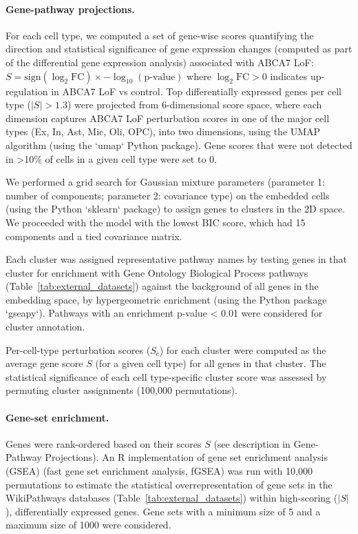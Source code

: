 \paragraph{Gene-pathway projections.}
For each cell type, we computed a set of gene-wise scores quantifying the direction and statistical significance of gene expression changes (computed as part of the differential gene expression analysis) associated with ABCA7 LoF:
$ S = \text{sign}(\log_2\text{FC}) \times -\log_{10}(\text{p-value}) $
where $\log_2\text{FC} > 0$ indicates up-regulation in ABCA7 LoF vs control. Top differentially expressed genes per cell type ($|S| > 1.3$) were projected from 6-dimensional score space, where each dimension captures ABCA7 LoF perturbation scores in one of the major cell types (Ex, In, Ast, Mic, Oli, OPC), into two dimensions, using the UMAP algorithm (using the `umap` Python package). Gene scores that were not detected in >10\% of cells in a given cell type were set to 0.

We performed a grid search for Gaussian mixture parameters (parameter 1: number of components; parameter 2: covariance type) on the embedded cells (using the Python `sklearn` package) to assign genes to clusters in the 2D space. We proceeded with the model with the lowest BIC score, which had 15 components and a tied covariance matrix.

Each cluster was assigned representative pathway names by testing genes in that cluster for enrichment with Gene Ontology Biological Process pathways (Table~\ref{tab:external_datasets}) against the background of all genes in the embedding space, by hypergeometric enrichment (using the Python package `gseapy`). Pathways with an enrichment p-value < 0.01 were considered for cluster annotation.

Per-cell-type perturbation scores ($S_c$) for each cluster were computed as the average gene score $S$ (for a given cell type) for all genes in that cluster. The statistical significance of each cell type-specific cluster score was assessed by permuting cluster assignments (100,000 permutations).

\paragraph{Gene-set enrichment.}
Genes were rank-ordered based on their scores $S$ (see description in Gene-Pathway Projections). An R implementation of gene set enrichment analysis (GSEA) \cite{Leek2007-lb,Subramanian2005-zt} (fast gene set enrichment analysis, fGSEA) was run with 10,000 permutations to estimate the statistical overrepresentation of gene sets in the WikiPathways databases (Table~\ref{tab:external_datasets}) within high-scoring ($|S|$), differentially expressed genes. Gene sets with a minimum size of 5 and a maximum size of 1000 were considered.

